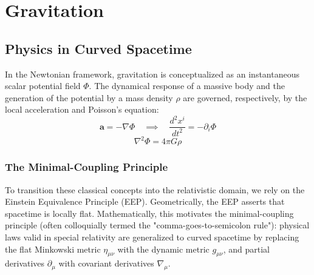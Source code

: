 \documentclass[11pt, a4paper]{report}
\begin{document}
\chapter{Gravitation}

\section{Physics in Curved Spacetime}

In the Newtonian framework, gravitation is conceptualized as an instantaneous scalar potential field $\Phi$. The dynamical response of a massive body and the generation of the potential by a mass density $\rho$ are governed, respectively, by the local acceleration and Poisson's equation:
\begin{equation}
\label{eq:newton_accel}
\mathbf{a} = -\nabla\Phi \quad \implies \quad \frac{d^{2}x^{i}}{dt^{2}} = -\partial_{i}\Phi
\end{equation}
\begin{equation}
\label{eq:poisson}
\nabla^{2}\Phi = 4\pi G\rho
\end{equation}

\subsection*{The Minimal-Coupling Principle}
To transition these classical concepts into the relativistic domain, we rely on the Einstein Equivalence Principle (EEP). Geometrically, the EEP asserts that spacetime is locally flat. Mathematically, this motivates the minimal-coupling principle (often colloquially termed the "comma-goes-to-semicolon rule"): physical laws valid in special relativity are generalized to curved spacetime by replacing the flat Minkowski metric $\eta_{\mu\nu}$ with the dynamic metric $g_{\mu\nu}$, and partial derivatives $\partial_{\mu}$ with covariant derivatives $\nabla_{\mu}$.
\end{document}
